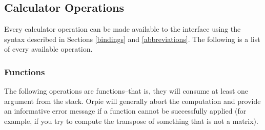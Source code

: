 \documentclass[11pt,notitlepage]{article}
\begin{document}
\subsection{Calculator Operations}
\label{operationslist}
Every calculator operation can be made available to the interface using the syntax
described in Sections \ref{bindings} and \ref{abbreviations}.  The following is a
list of every available operation.

\subsubsection{Functions}
\label{functions}
The following operations are functions--that is, they will consume at least one
argument from the stack.  Orpie will generally abort the computation and
provide an informative error message if a function cannot be successfully applied (for
example, if you try to compute the transpose of something that is not a matrix).
\end{document}

